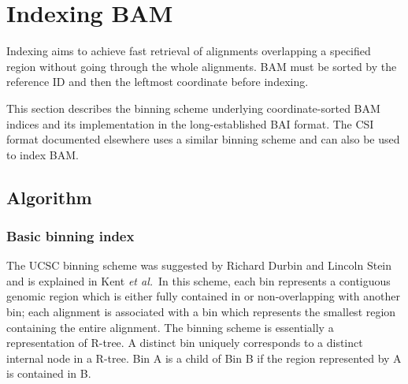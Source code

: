 \documentclass[10pt]{article}
\begin{document}

\pagebreak

\section{Indexing BAM}
Indexing aims to achieve fast retrieval of alignments overlapping a
specified region without going through the whole alignments. BAM must be
sorted by the reference ID and then the leftmost coordinate before
indexing.

This section describes the binning scheme underlying coordinate-sorted
BAM indices and its implementation in the long-established BAI format.
The CSI format documented elsewhere uses a similar binning scheme and
can also be used to index BAM.\footnotemark


\subsection{Algorithm}
\subsubsection{Basic binning index}
The UCSC binning scheme was suggested by Richard Durbin and Lincoln Stein
and is explained in Kent {\it et al.}\footnotemark\ In this scheme, each bin
represents a contiguous genomic region which is either fully contained
in or non-overlapping with another bin; each alignment is associated
with a bin which represents the smallest region containing the entire
alignment. The binning scheme is essentially a representation of
R-tree. A distinct bin uniquely corresponds to a distinct internal node
in a R-tree. Bin A is a child of Bin B if the region represented by A is
contained in B.
\end{document}

